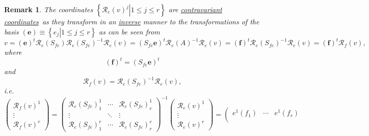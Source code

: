 \documentclass[aps,preprint]{revtex4}
\newtheorem{remark}[theorem]{Remark}
\begin{document}
\begin{remark}
The coordinates $\left\{ \left. \mathcal{R}_{e}\left( v\right)
^{j}\right\vert 1\leq j\leq r\right\} $ are \underline{\emph{contravariant
coordinates}}\emph{\ }as they transform in an \underline{inverse} manner to
the transformations of the basis $\left( \boldsymbol{e}\right) \equiv
\left\{ \left. e_{j}\right\vert 1\leq j\leq r\right\} $ as can be seen from 
\begin{equation}
v=\left( \boldsymbol{e}\right) ^{t}\mathcal{R}_{e}\left( S_{fe}\right) 
\mathcal{R}_{e}\left( S_{fe}\right) ^{-1}\mathcal{R}_{e}\left( v\right)
=\left( S_{fe}\boldsymbol{e}\right) ^{t}\mathcal{R}_{e}\left( A\right) ^{-1}%
\mathcal{R}_{e}\left( v\right) =\left( \boldsymbol{f}\right) ^{t}\mathcal{R}%
_{e}\left( S_{fe}\right) ^{-1}\mathcal{R}_{e}\left( v\right) =\left( 
\boldsymbol{f}\right) ^{t}\mathcal{R}_{f}\left( v\right) ,
\end{equation}%
where 
\begin{equation}
\left( \boldsymbol{f}\right) ^{t}=\left( S_{fe}\boldsymbol{e}\right) ^{t}
\end{equation}%
and 
\begin{equation}
\mathcal{R}_{f}\left( v\right) =\mathcal{R}_{e}\left( S_{fe}\right) ^{-1}%
\mathcal{R}_{e}\left( v\right) ,
\end{equation}%
i.e. 
\begin{equation}
\left( 
\begin{array}{c}
\mathcal{R}_{f}\left( v\right) ^{1} \\ 
\vdots \\ 
\mathcal{R}_{f}\left( v\right) ^{r}%
\end{array}%
\right) =\left( 
\begin{array}{ccc}
\mathcal{R}_{e}\left( S_{fe}\right) _{1}^{1} & \cdots & \mathcal{R}%
_{e}\left( S_{fe}\right) _{r}^{1} \\ 
\vdots & \ddots & \vdots \\ 
\mathcal{R}_{e}\left( S_{fe}\right) _{1}^{r} & \cdots & \mathcal{R}%
_{e}\left( S_{fe}\right) _{r}^{r}%
\end{array}%
\right) ^{-1}\left( 
\begin{array}{c}
\mathcal{R}_{e}\left( v\right) ^{1} \\ 
\vdots \\ 
\mathcal{R}_{e}\left( v\right) ^{r}%
\end{array}%
\right) =\left( 
\begin{array}{ccc}
e^{1}\left( f_{1}\right) & \cdots & e^{1}\left( f_{r}\right) \\ 

\end{array}
\end{equation}
\end{remark}
\end{document}
